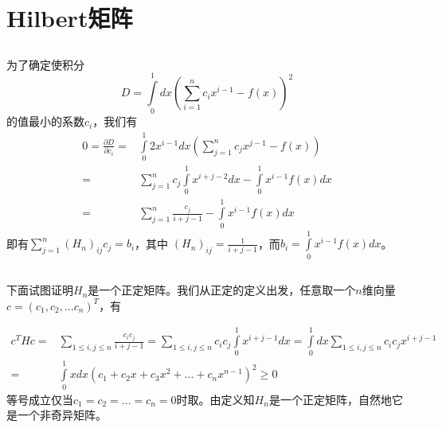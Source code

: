 \documentclass[UTF8]{ctexart}
\begin{document}
\section{Hilbert矩阵}
\subsection{}
为了确定使积分
\begin{equation}
D=\int\limits_0^1 dx(\sum\limits_{i=1}^n c_i x^{i-1}-f(x))^2
\end{equation}
的值最小的系数$c_i$，我们有
\begin{equation}
\begin{aligned}
0=\frac{\partial D}{\partial c_i}=&\int\limits_0^1 2x^{i-1}dx(\sum\limits_{j=1}^n c_j x^{j-1}-f(x))\\
=&\sum\limits_{j=1}^n c_j \int\limits_0^1 x^{i+j-2}dx-\int\limits_0^1 x^{i-1}f(x)dx\\
=&\sum\limits_{j=1}^n\frac{c_j}{i+j-1}-\int\limits_0^1 x^{i-1}f(x)dx
\end{aligned}
\end{equation}
即有$\sum\limits_{j=1}^n(H_n)_{ij}c_j=b_i$，其中
$(H_n)_{ij}=\frac{1}{i+j-1}$，而$b_i=\int\limits_0^1 x^{i-1}f(x)dx$。
\subsection{}
下面试图证明$H_n$是一个正定矩阵。我们从正定的定义出发，任意取一个$n$维向量$c=(c_1,c_2,...c_n)^T$，有


\begin{equation}
\begin{aligned}
c^THc=&\sum\limits_{1\leq i,j\leq n}\frac{c_ic_j}{i+j-1}
=\sum\limits_{1\leq i,j\leq n}c_ic_j \int\limits_0^1 x^{i+j-1}dx
=\int\limits_0^1 dx\sum\limits_{1\leq i,j\leq n}c_ic_jx^{i+j-1}\\
=&\int\limits_0^1 xdx (c_1+c_2x+c_3x^2+...+c_nx^{n-1})^2
\geq 0
\end{aligned}
\end{equation}
等号成立仅当$c_1=c_2=...=c_n=0$时取。由定义知$H_n$是一个正定矩阵，自然地它是一个非奇异矩阵。
\end{document}
